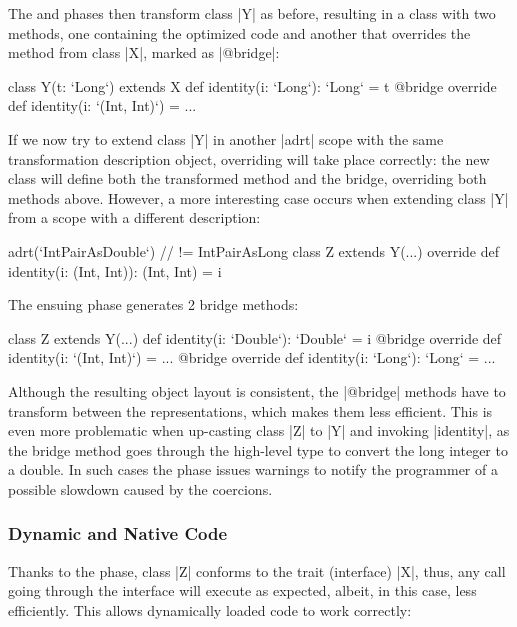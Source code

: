 The \coerce{} and \commit{} phases then transform class |Y| as before, resulting in a class with two methods, one containing the optimized code and another that overrides the method from class |X|, marked as |@bridge|:

\begin{lstlisting-nobreak}
class Y(t: `Long`) extends X {
  def identity(i: `Long`): `Long` = t
  @bridge override def identity(i: `(Int, Int)`) = ...
}
\end{lstlisting-nobreak}

If we now try to extend class |Y| in another |adrt| scope with the same transformation description object, overriding will take place correctly: the new class will define both the transformed method and the bridge, overriding both methods above. However, a more interesting case occurs when extending class |Y| from a scope with a different description:

\begin{lstlisting-nobreak}
adrt(`IntPairAsDouble`) { // != IntPairAsLong
  class Z extends Y(...) {
    override def identity(i: (Int, Int)): (Int, Int) = i
  }
}
\end{lstlisting-nobreak}

The ensuing \bridge{} phase generates 2 bridge methods:

\begin{lstlisting-nobreak}
class Z extends Y(...) {
  def identity(i: `Double`): `Double` = i
  @bridge override def identity(i: `(Int, Int)`) = ...
  @bridge override def identity(i: `Long`): `Long` = ...
}
\end{lstlisting-nobreak}

Although the resulting object layout is consistent, the |@bridge| methods have to transform between the representations, which makes them less efficient. This is even more problematic when up-casting class |Z| to |Y| and invoking |identity|, as the bridge method goes through the high-level type to convert the long integer to a double. In such cases the \bridge{} phase issues warnings to notify the programmer of a possible slowdown caused by the coercions.

\subsubsection*{Dynamic and Native Code}

Thanks to the \bridge{} phase, class |Z| conforms to the trait (interface) |X|, thus, any call going through the interface will execute as expected, albeit, in this case, less efficiently. This allows dynamically loaded code to work correctly:

